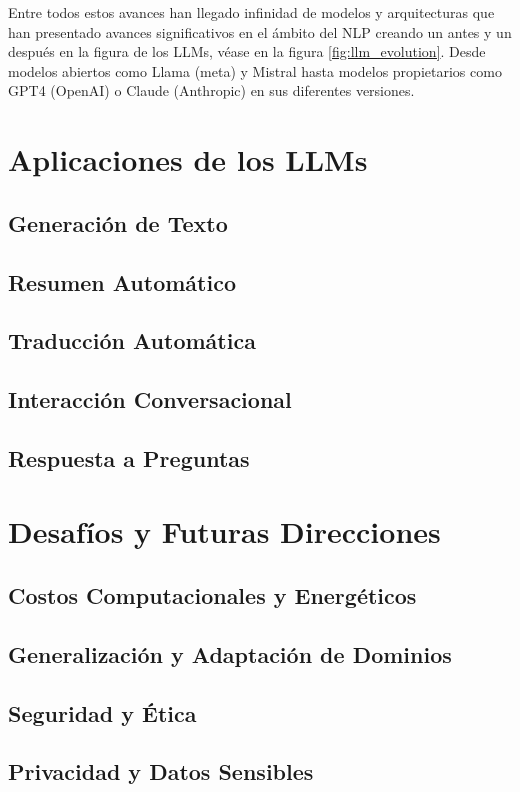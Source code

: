 Entre todos estos avances han llegado infinidad de modelos y arquitecturas que han presentado avances significativos en el ámbito del NLP creando un antes y un después en la figura de los LLMs, véase en la figura \ref{fig:llm_evolution}. Desde modelos abiertos como Llama (meta) y Mistral hasta modelos propietarios como GPT4 (OpenAI) o Claude (Anthropic) en sus diferentes versiones.


\section{Aplicaciones de los LLMs}
\subsection{Generación de Texto}

\subsection{Resumen Automático}

\subsection{Traducción Automática}

\subsection{Interacción Conversacional}

\subsection{Respuesta a Preguntas}


\section{Desafíos y Futuras Direcciones}
\subsection{Costos Computacionales y Energéticos}

\subsection{Generalización y Adaptación de Dominios}

\subsection{Seguridad y Ética}

\subsection{Privacidad y Datos Sensibles}

